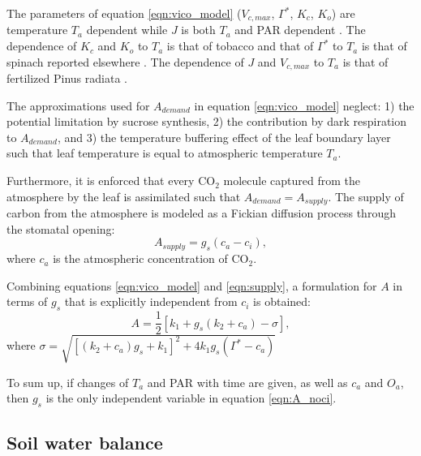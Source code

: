 \documentclass[utf8]{frontiersSCNS} %
\begin{document}
The parameters of equation \ref{eqn:vico_model} ($V_{c,max}$, $\Gamma^*$, $K_c$, $K_o$) are temperature $T_a$ dependent while $J$ is both $T_a$ and PAR dependent \citep{Medlyn2002}. The dependence of $K_c$ and $K_o$ to $T_a$ is that of tobacco \citep{Bernacchi2001} and that of $\Gamma^*$ to $T_a$ is that of spinach reported elsewhere \citep{Brooks1985}. The dependence of $J$ and $V_{c,max}$ to $T_a$ is that of fertilized Pinus radiata \citep{Medlyn2002}.

The approximations used for $A_{demand}$ in equation \ref{eqn:vico_model} neglect: 1) the potential limitation by sucrose synthesis, 2) the contribution by dark respiration to $A_{demand}$, and 3) the temperature buffering effect of the leaf boundary layer such that leaf temperature is equal to atmospheric temperature $T_a$.

Furthermore, it is enforced that every CO$_2$ molecule captured from the atmosphere by the leaf is assimilated such that $A_{demand} = A_{supply}$. The supply of carbon from the atmosphere is modeled as a Fickian diffusion process through the stomatal opening:
\begin{equation}
    \label{eqn:supply}
    A_{supply} = g_s(c_a - c_i),
\end{equation}
where $c_a$ is the atmospheric concentration of CO$_2$.

Combining equations \ref{eqn:vico_model} and \ref{eqn:supply}, a formulation for $A$ in terms of $g_s$ that is explicitly independent from $c_i$ is obtained:
\begin{equation}
    \label{eqn:A_noci}
    A = \frac{1}{2}[k_1 + g_s(k_2 + c_a) - \sigma],
\end{equation}
where $\sigma = \sqrt{[(k_2 + c_a)g_s + k_1]^2 + 4k_1 g_s (\Gamma^*-c_a)}$

To sum up, if changes of $T_a$ and PAR with time are given, as well as $c_a$ and $O_a$, then $g_s$ is the only independent variable in equation \ref{eqn:A_noci}.

\subsection{Soil water balance}

\end{document}
